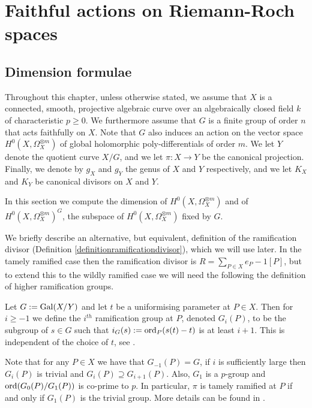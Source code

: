\chapter{Faithful actions on Riemann-Roch spaces} \label{Chapter:Faithfulactions}
\section{Dimension formulae}\label{dimsection}



Throughout this chapter, unless otherwise stated, we assume that $X$ is a connected, smooth, projective algebraic curve over an algebraically closed field $k$ of characteristic $p \geq 0$.
We furthermore assume that $G$ is a finite group of order $n$ that acts faithfully on $X$.
Note that $G$ also induces an action on the vector space $H^0(X,\Omega_X^{\otimes m})$ of global holomorphic poly-differentials of order $m$.
We let $Y$ denote the quotient curve $X/G$, and we let $\pi:X\rightarrow Y$ be the canonical projection.
Finally, we denote by $g_X$ and $g_Y$ the genus of $X$ and $Y$ respectively, and we let $K_X$ and $K_Y$ be canonical divisors on $X$ and $Y$.


In this section we compute the dimension of $H^0(X,\Omega_X^{\otimes m})$ and of $H^0(X,\Omega_X^{\otimes m})^G$, the subspace of $H^0(X,\Omega_X^{\otimes m})$ fixed by $G$.


We briefly describe an alternative, but equivalent, definition of the ramification divisor (Definition \ref{definitionramificationdivisor}), which we will use later.
In the tamely ramified case then the ramification divisor is $R = \sum_{P \in X}e_P-1 [P]$, but to extend this to the wildly ramified case we will need the following the definition of higher ramification groups.


    \begin{defn}
    Let $G:=\operatorname{Gal}(X/Y)$ and let $t$ be a uniformising parameter at $P\in X$.
    Then for $i\geq -1$ we define the $i^{th}$ ramification group at $P$, denoted $G_i(P)$, to be the subgroup of $s\in G$ such that $i_G(s) := \operatorname{ord}_P(s(t)-t)$ is at least $i+1$.
    This is	independent of the choice of $t$, see \cite[Chap. IV, \S 1, pg. 62]{localfields}.
    \end{defn}

Note that for any $P\in X$ we have that $G_{-1}(P)=G$, if $i$ is sufficiently large then $G_i(P)$ is trivial and $G_i(P)\supseteq G_{i+1}(P)$.
Also, $G_1$ is a $p$-group and $\operatorname{ord}(G_0(P)/G_1(P))$ is co-prime to $p$.
In particular, $\pi$ is tamely ramified at $P$ if and only if $G_1(P)$ is the trivial group.
More details can be found in \cite[Chap. IV, \S 1]{localfields}.%

